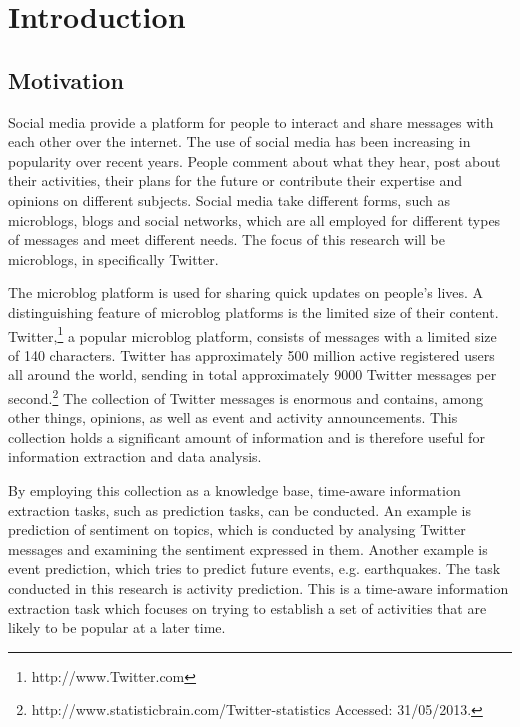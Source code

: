 
\chapter{Introduction} %

\label{ch:name} %



\section{Motivation}

Social media provide a platform for people to interact and share messages with each other over the internet. The use of social media has been increasing in popularity over recent years. People comment about what they hear, post about their activities, their plans for the future or contribute their expertise and opinions on different subjects.  Social media take different forms, such as microblogs, blogs and social networks, which are all employed for different types of messages and meet different needs. The focus of this research will be microblogs, in specifically Twitter.

The microblog platform is used for sharing quick updates on people's lives. A distinguishing feature of microblog platforms is the limited size of their content. Twitter,\footnote{http://www.Twitter.com} a popular microblog platform, consists of messages with a limited size of 140 characters. Twitter has approximately 500 million active registered users all around the world, sending in total approximately 9000 Twitter messages per second.\footnote{http://www.statisticbrain.com/Twitter-statistics Accessed: 31/05/2013.} The collection of Twitter messages is enormous and contains, among other things, opinions, as well as event and activity announcements. This collection holds a significant amount of information and is therefore useful for information extraction and data analysis. 

By employing this collection as a knowledge base, time-aware information extraction tasks, such as prediction tasks, can be conducted. An example is prediction of sentiment on topics, which is conducted by analysing Twitter messages and examining the sentiment expressed in them. Another example is event prediction, which tries to predict future events, e.g. earthquakes\cite{Sakaki}. The task conducted in this research is activity prediction. This is a time-aware information extraction task which focuses on trying to establish a set of activities that are likely to be popular at a later time. 

